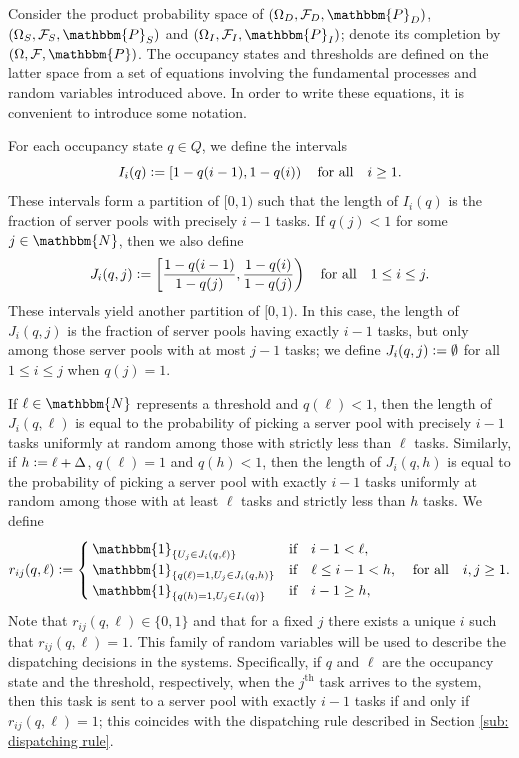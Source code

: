\documentclass[a4paper, 12pt]{article}
\theoremstyle{definition}
\newcommand{\ind}[1]{\mathbbm{1}_{\left\{#1\right\}}}
\newcommand{\defeq}{\vcentcolon=}
\newcommand{\prob}{\mathbbm{P}}
\newcommand{\calF}{\mathcal{F}}
\newcommand{\N}{\mathbbm{N}}
\begin{document}
Consider the product probability space of $(\Omega_D, \calF_D, \prob_D)$, $(\Omega_S, \calF_S, \prob_S)$ and $(\Omega_I, \calF_I, \prob_I)$; denote its completion by $(\Omega, \calF, \prob)$. The occupancy states and thresholds are defined on the latter space from a set of equations involving the fundamental processes and random variables introduced above. In order to write these equations, it is convenient to introduce some notation.

For each occupancy state $q \in Q$, we define the intervals
\begin{equation*}
	I_i(q) \defeq \left[1 - q(i - 1), 1 - q(i)\right) \quad \text{for all} \quad i \geq 1.
\end{equation*}
These intervals form a partition of $[0, 1)$ such that the length of $I_i(q)$ is the fraction of server pools with precisely $i - 1$ tasks. If $q(j) < 1$ for some $j \in \N$, then we also define
\begin{equation*}
	J_i(q, j) \defeq \left[\frac{1 - q(i - 1)}{1 - q(j)}, \frac{1 - q(i)}{1 - q(j)}\right) \quad \text{for all} \quad 1 \leq i \leq j.
\end{equation*}
These intervals yield another partition of $[0, 1)$. In this case, the length of $J_i(q, j)$ is the fraction of server pools having exactly $i - 1$ tasks, but only among those server pools with at most $j - 1$ tasks; we define $J_i(q, j) \defeq \emptyset$ for all $1 \leq i \leq j$ when $q(j) = 1$.

If $\ell \in \N$ represents a threshold and $q(\ell) < 1$, then the length of $J_i(q, \ell)$ is equal to the probability of picking a server pool with precisely $i - 1$ tasks uniformly at random among those with strictly less than $\ell$ tasks. Similarly, if $h \defeq \ell + \Delta$, $q(\ell) = 1$ and  $q(h) < 1$, then the length of $J_i(q, h)$ is equal to the probability of picking a server pool with exactly $i - 1$ tasks uniformly at random among those with at least $\ell$ tasks and strictly less than $h$ tasks. We define
\begin{equation*}
	r_{ij}(q, \ell) \defeq \begin{cases}
		\ind{U_j \in J_i(q, \ell)} & \text{if} \quad i - 1 < \ell, \\
		\ind{q(\ell) = 1, U_j \in J_i(q, h)} & \text{if} \quad \ell \leq i - 1 < h, \\
		\ind{q(h) = 1, U_j \in I_i(q)} & \text{if} \quad i - 1 \geq h,
	\end{cases}
	\quad \text{for all} \quad i,j \geq 1.
\end{equation*}
Note that $r_{ij}(q, \ell) \in \{0, 1\}$ and that for a fixed $j$ there exists a unique $i$ such that $r_{ij}(q, \ell) = 1$. This family of random variables will be used to describe the dispatching decisions in the systems. Specifically, if $q$ and $\ell$ are the occupancy state and the threshold, respectively, when the $j^{\text{th}}$ task arrives to the system, then this task is sent to a server pool with exactly $i - 1$ tasks if and only if $r_{ij}(q, \ell) = 1$; this coincides with the dispatching rule described in Section \ref{sub: dispatching rule}.
\end{document}
